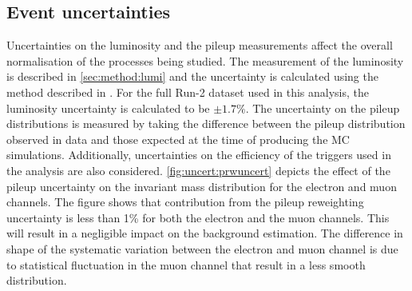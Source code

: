 \subsection{Event uncertainties}
Uncertainties on the luminosity and the pileup measurements affect the overall normalisation of the processes being studied. The measurement of the luminosity is described in \cref{sec:method:lumi} and the uncertainty is calculated using the method described in \cite{Aaboud:2208146}. For the full Run-2 dataset used in this analysis, the luminosity uncertainty is calculated to be $\pm 1.7\%$. The uncertainty on the pileup distributions is measured by taking the difference between the pileup distribution observed in data and those expected at the time of producing the MC simulations. Additionally, uncertainties on the efficiency of the triggers used in the analysis are also considered.  \cref{fig:uncert:prwuncert} depicts the effect of the pileup uncertainty on the invariant mass distribution for the electron and muon channels. The figure shows that contribution from the pileup reweighting uncertainty is less than 1\% for both the electron and the muon channels. This will result in a negligible impact on the background estimation. The difference in shape of the systematic variation between the electron and muon channel is due to statistical fluctuation in the muon channel that result in a less smooth distribution. 

